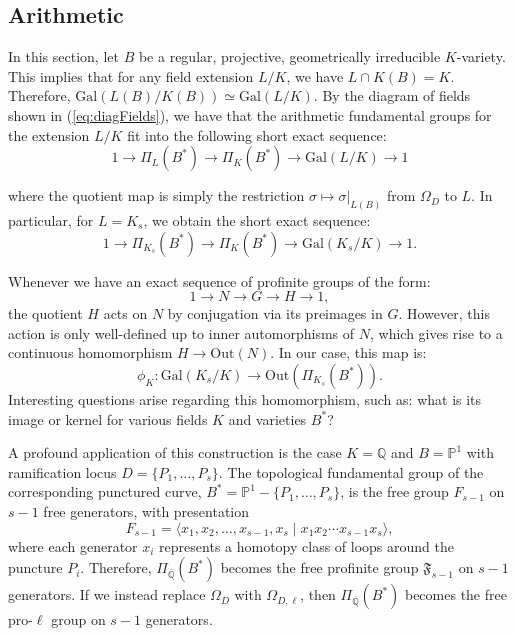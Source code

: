 \documentclass[10pt]{amsart}
\theoremstyle{definition}
\newcommand{\Gal}{{ \mathrm{Gal}}}
\newcommand{\Out}{{ \mathrm{Out}}}
\begin{document}
\subsection{Arithmetic} \label{sec:profinite_braids}
In this section, let $B$ be a regular, projective, geometrically irreducible $K$-variety. This implies that for any field extension $L/K$, we have $L \cap K(B) = K$. Therefore, $\Gal (L(B) / K(B)) \simeq \Gal(L/K)$.
By the diagram of fields shown in (\ref{eq:diagFields}), we have that 
the arithmetic fundamental groups for the extension $L/K$ fit into the following short exact sequence:
\[
  1 \rightarrow \Pi_L(B^*) \rightarrow \Pi_K(B^*) \rightarrow \Gal(L/K) \rightarrow 1
\]

where the quotient map is simply the restriction $\sigma\mapsto \sigma|_{L(B)}$ from $\Omega_D$ to $L$. In particular, for $L=K_s$, we obtain the short exact sequence:
\begin{equation}
\label{ses}
  1 \rightarrow \Pi_{K_s}(B^*) \rightarrow \Pi_K(B^*) \rightarrow \Gal(K_s/K) \rightarrow 1.
\end{equation}

Whenever we have an exact sequence of profinite groups of the form:
\[1\rightarrow N \rightarrow G \rightarrow H\rightarrow 1,\] 
the quotient $H$ acts on $N$ by conjugation via its preimages in $G$. However, this action is only well-defined  up to inner automorphisms of $N$, which gives rise to a continuous homomorphism $H \rightarrow \Out(N)$. 
In our case, this map is: 
\[\phi_K \colon \Gal(K_s/K) \longrightarrow \Out(\Pi_{K_s}(B^*)).\]
Interesting questions arise regarding this homomorphism, such as: what is its image or kernel for various fields $K$ and varieties $B^*$? 

A profound application of this construction is the case $K=\mathbb{Q}$ and $B=\mathbb{P}^1$ with ramification locus $D = \{P_1,\ldots,P_s\}$. 
The topological fundamental group of the corresponding punctured curve, $B^*=\mathbb{P}^1-\{P_1,\ldots,P_s\}$,  is the free group $F_{s-1}$ on $s-1$ free generators, with presentation
\[
F_{s-1} = \langle x_1,x_2,\ldots,x_{s-1},x_s \mid x_1x_2\cdots x_{s-1}x_s\rangle ,
\] 
where each generator $x_i$ represents a homotopy class of loops around the puncture $P_i$. Therefore, $\Pi_{\overline{\mathbb{Q}}}(B^*)$ becomes the free profinite group $\mathfrak{F}_{s-1}$ on $s-1$ generators. 
If we instead replace $\Omega_D$ with $\Omega_{D,\ell}$, then $\Pi_{\overline{\mathbb{Q}}}(B^*)$  becomes the free pro-$\ell$ group on $s-1$ generators. 
\end{document}

